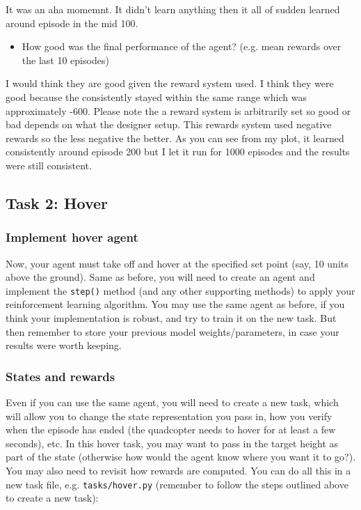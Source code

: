 \documentclass[11pt]{article}
\providecommand{\tightlist}{%
      \setlength{\itemsep}{0pt}\setlength{\parskip}{0pt}}
\begin{document}
It was an aha momemnt. It didn't learn anything then it all of sudden
learned around episode in the mid 100.

\begin{itemize}
\tightlist
\item
  How good was the final performance of the agent? (e.g. mean rewards
  over the last 10 episodes)
\end{itemize}

I would think they are good given the reward system used. I think they
were good because the consistently stayed within the same range which
was approximately -600. Please note the a reward system is arbitrarily
set so good or bad depends on what the designer setup. This rewards
system used negative rewards so the less negative the better. As you can
see from my plot, it learned consistently around episode 200 but I let
it run for 1000 episodes and the results were still consistent.

\subsection{Task 2: Hover}\label{task-2-hover}

\subsubsection{Implement hover agent}\label{implement-hover-agent}

Now, your agent must take off and hover at the specified set point (say,
10 units above the ground). Same as before, you will need to create an
agent and implement the \texttt{step()} method (and any other supporting
methods) to apply your reinforcement learning algorithm. You may use the
same agent as before, if you think your implementation is robust, and
try to train it on the new task. But then remember to store your
previous model weights/parameters, in case your results were worth
keeping.

\subsubsection{States and rewards}\label{states-and-rewards}

Even if you can use the same agent, you will need to create a new task,
which will allow you to change the state representation you pass in, how
you verify when the episode has ended (the quadcopter needs to hover for
at least a few seconds), etc. In this hover task, you may want to pass
in the target height as part of the state (otherwise how would the agent
know where you want it to go?). You may also need to revisit how rewards
are computed. You can do all this in a new task file, e.g.
\texttt{tasks/hover.py} (remember to follow the steps outlined above to
create a new task):
\end{document}
